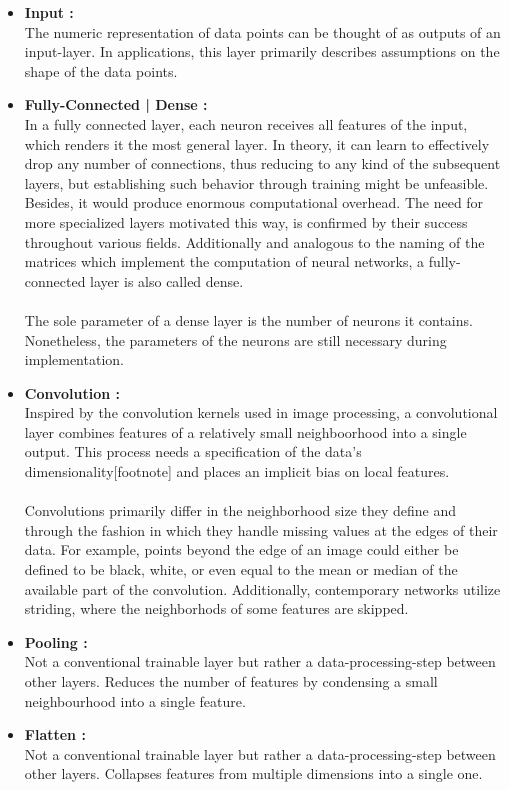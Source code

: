 \begin{itemize}
	\item \textbf{Input :}\\
	The numeric representation of data points can be thought of as outputs of an input-layer. In
	applications, this layer primarily describes assumptions on the shape of the data points. \\
	\item \textbf{Fully-Connected | Dense :}\\
	In a fully connected layer, each neuron receives all features of the input, which renders it the most general layer.  In theory, it can learn to effectively drop any number of connections, thus reducing to any kind of the subsequent layers, but establishing such behavior through training might be unfeasible. Besides, it would produce enormous computational overhead. The need for more specialized layers motivated this way, is confirmed by their success throughout various fields.
	Additionally and analogous to the naming of the matrices which implement the computation of neural networks, a fully-connected layer is also called dense.\\
	\\
	The sole parameter of a dense layer is the number of neurons it contains. Nonetheless, the parameters of the neurons are still necessary during implementation.\\
	\item \textbf{Convolution :}\\
	Inspired by the convolution kernels used in image processing, a convolutional layer combines features of a relatively small neighboorhood into a single output. This process needs a specification of the data's dimensionality[footnote] and places an implicit bias on local features. \\
	\\
	Convolutions primarily differ in the neighborhood size they define and through the fashion in which they handle missing values at the edges of their data. For example, points beyond the edge of an image could either be defined to be black, white, or even equal to the mean or median of the available part of the convolution. Additionally, contemporary networks utilize striding, where the neighborhods of some features are skipped.\\
	\item \textbf{Pooling :}\\
	Not a conventional trainable layer but rather a data-processing-step between other layers. Reduces the number of features by condensing a small neighbourhood into a single feature.\\
	\item \textbf{Flatten :}\\  
	Not a conventional trainable layer but rather a data-processing-step between other layers. Collapses features from multiple dimensions into a single one.\\
\end{itemize}

